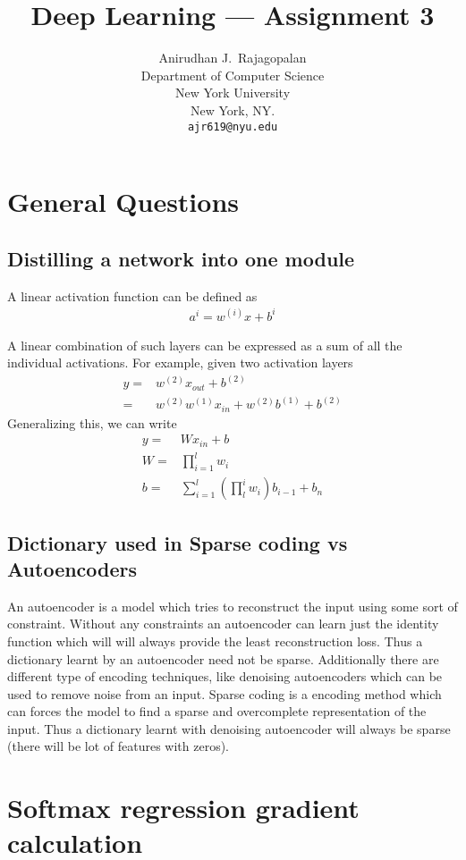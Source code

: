 \documentclass{article}
\title{Deep Learning --- Assignment 3}
\author{Anirudhan J.~Rajagopalan \\
  Department of Computer Science\\
  New York University\\
  New York, NY.\\
  \texttt{ajr619@nyu.edu} \\
}
\begin{document}
\maketitle

\section{General Questions}
\subsection{Distilling a network into one module}
A linear activation function can be defined as 
\begin{align*}
  a^{{i}} = w^{(i)}x + b^{i}
\end{align*}

A linear combination of such layers can be expressed as a sum of all the individual activations.  For example, given two activation layers
\begin{align*}
  y =& w^{(2)}x_{out} + b^{(2)}\\
  =& w^{(2)}w^{(1)}x_{in} + w^{(2)}b^{(1)} + b^{(2)}
\end{align*}
Generalizing this, we can write
\begin{align*}
  y =& Wx_{in} + b \\
  W =& \prod_{i = 1}^{l} w_{i} \\
  b =& \sum_{i = 1}^{l} (\prod_{l}^{i} w_{i})b_{i-1} + b_{n}
\end{align*}

\subsection{Dictionary used in Sparse coding vs Autoencoders}
An autoencoder is a model which tries to reconstruct the input using some sort of constraint.  Without any constraints an autoencoder can learn just the identity function which will will always provide the least reconstruction loss.  Thus a dictionary learnt by an autoencoder need not be sparse.  Additionally there are different type of encoding techniques, like denoising autoencoders which can be used to remove noise from an input.
Sparse coding is a encoding method which can forces the model to find a sparse and overcomplete representation of the input.  
Thus a dictionary learnt with denoising autoencoder will always be sparse (there will be lot of features with zeros).


\section{Softmax regression gradient calculation}
\end{document}
